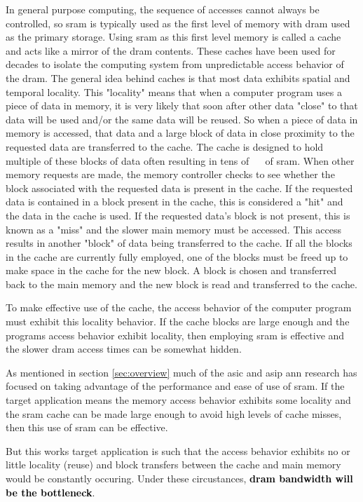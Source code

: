 In general purpose computing, the sequence of accesses cannot always be controlled, so \ac{sram} is typically used as the first level of memory with \ac{dram} used as the primary storage. 
Using \ac{sram} as this first level memory is called a cache and acts like a mirror of the \ac{dram} contents.
These caches have been used for decades to isolate the computing system from unpredictable access behavior of the \ac{dram}.
The general idea behind caches is that most data exhibits spatial and temporal locality. This "locality" means that when a computer program uses a piece of data in memory, it is very likely that soon after other data "close" to that data will be used and/or the same data will be reused.
So when a piece of data in memory is accessed, that data and a large block of data in close proximity to the requested data are transferred to the cache. 
The cache is designed to hold multiple of these blocks of data often resulting in tens of \SI[per-mode=symbol]{}{\kilo \byte} of \ac{sram}.
When other memory requests are made, the memory controller checks to see whether the block associated with the requested data is present in the cache.
If the requested data is contained in a block present in the cache, this is considered a "hit" and the data in the cache is used. 
If the requested data's block is not present, this is known as a "miss" and the slower main memory must be accessed. This access results in another "block" of data being transferred to the cache.
If all the blocks in the cache are currently fully employed, one of the blocks must be freed up to make space in the cache for the new block. 
A block is chosen and transferred back to the main memory and the new block is read and transferred to the cache.

To make effective use of the cache, the access behavior of the computer program must exhibit this locality behavior. 
If the cache blocks are large enough and the programs access behavior exhibit locality, then employing \ac{sram} is effective and the slower \ac{dram} access times can be somewhat hidden.

As mentioned in section \ref{sec:overview} much of the \ac{asic} and \ac{asip} \ac{ann} research has focused on taking advantage of the performance and ease of use of \ac{sram}. 
If the target application means the memory access behavior exhibits some locality and the \ac{sram} cache can be made large enough to avoid high levels of cache misses, then this use of \ac{sram} can be effective.

But this works target application is such that the access behavior exhibits no or little locality (reuse) and block transfers between the cache and main memory would be constantly occuring.
Under these circustances, \textbf{\textcolor{black}{\ac{dram} bandwidth will be the bottleneck}}.

